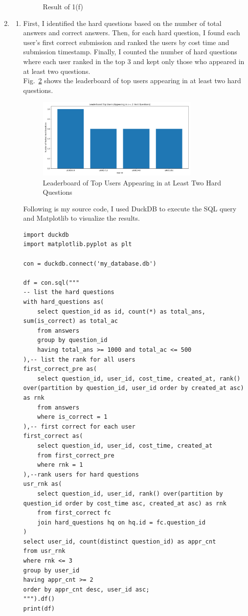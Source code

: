 \documentclass[12pt,a4paper]{article}
\begin{document}
\begin{enumerate}
\begin{enumerate}
\begin{figure}[H]
            \caption{Result of 1(f)}
            \label{fig:1f}
        \end{figure}
    \end{enumerate}
    \item
    \begin{enumerate}
        \item First, I identified the hard questions based on the number of total answers and correct answers. Then, for each hard question, I found each user’s first correct submission and ranked the users by cost time and submission timestamp. Finally, I counted the number of hard questions where each user ranked in the top 3 and kept only those who appeared in at least two questions.\\
        Fig.~\ref{fig:2a} shows the leaderboard of top users appearing in at least two hard questions.
        \begin{figure}[H]
            \centering
            \includegraphics[width=0.8\textwidth]{code/2a_leaderboard.png}
            \caption{Leaderboard of Top Users Appearing in at Least Two Hard Questions}
            \label{fig:2a}
        \end{figure}
        Following is my source code, I used DuckDB to execute the SQL query and Matplotlib to visualize the results.
        \begin{verbatim}
import duckdb
import matplotlib.pyplot as plt

con = duckdb.connect('my_database.db')

df = con.sql("""
-- list the hard questions
with hard_questions as(
    select question_id as id, count(*) as total_ans, sum(is_correct) as total_ac
    from answers
    group by question_id
    having total_ans >= 1000 and total_ac <= 500
),-- list the rank for all users
first_correct_pre as(
    select question_id, user_id, cost_time, created_at, rank() over(partition by question_id, user_id order by created_at asc) as rnk
    from answers
    where is_correct = 1
),-- first correct for each user
first_correct as(
    select question_id, user_id, cost_time, created_at
    from first_correct_pre
    where rnk = 1
),--rank users for hard questions
usr_rnk as(
    select question_id, user_id, rank() over(partition by question_id order by cost_time asc, created_at asc) as rnk
    from first_correct fc
    join hard_questions hq on hq.id = fc.question_id
)
select user_id, count(distinct question_id) as appr_cnt
from usr_rnk
where rnk <= 3
group by user_id
having appr_cnt >= 2
order by appr_cnt desc, user_id asc;
""").df()
print(df)


\end{verbatim}
\end{enumerate}
\end{enumerate}
\end{document}
